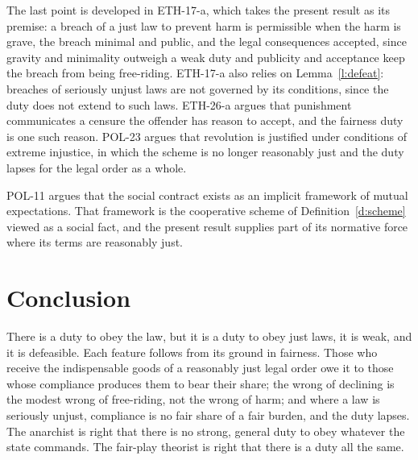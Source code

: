 \documentclass{situationist-preprint}
\begin{document}
The last point is developed in ETH-17-a, which takes the present result as its premise: a breach of a just law to prevent harm is permissible when the harm is grave, the breach minimal and public, and the legal consequences accepted, since gravity and minimality outweigh a weak duty and publicity and acceptance keep the breach from being free-riding. ETH-17-a also relies on Lemma~\ref{l:defeat}: breaches of seriously unjust laws are not governed by its conditions, since the duty does not extend to such laws. ETH-26-a argues that punishment communicates a censure the offender has reason to accept, and the fairness duty is one such reason. POL-23 argues that revolution is justified under conditions of extreme injustice, in which the scheme is no longer reasonably just and the duty lapses for the legal order as a whole.

POL-11 argues that the social contract exists as an implicit framework of mutual expectations. That framework is the cooperative scheme of Definition~\ref{d:scheme} viewed as a social fact, and the present result supplies part of its normative force where its terms are reasonably just.

\section{Conclusion}

There is a duty to obey the law, but it is a duty to obey just laws, it is weak, and it is defeasible. Each feature follows from its ground in fairness. Those who receive the indispensable goods of a reasonably just legal order owe it to those whose compliance produces them to bear their share; the wrong of declining is the modest wrong of free-riding, not the wrong of harm; and where a law is seriously unjust, compliance is no fair share of a fair burden, and the duty lapses. The anarchist is right that there is no strong, general duty to obey whatever the state commands. The fair-play theorist is right that there is a duty all the same.
\end{document}
